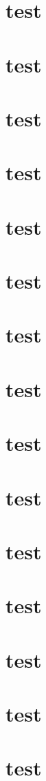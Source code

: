 \documentclass[type = doctor]{CCNUthesis}
\begin{document}
\chapter{test}
\chapter{test}
\chapter{test}
\chapter{test}
\chapter{test}
\chapter{test}
\chapter{test}
\chapter{test}
\chapter{test}
\chapter{test}
\chapter{test}
\chapter{test}
\chapter{test}
\chapter{test}
\chapter{test}
\end{document}
